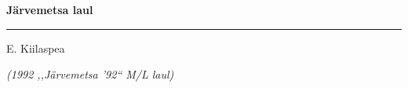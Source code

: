 \documentclass[10pt]{book}
\begin{document}
\pagebreak[3]
\clearpage
{
  \samepage
  \raggedbottom
  \raggedright
  \sloppy


  \vspace{0.2in}
    \centerline{
      \bfseries
      \large J\"arvemetsa laul
    }
  \nopagebreak[4]
  \vspace{0.1in}
  \nopagebreak[4]
  \hrule height 0.05ex
  \nopagebreak[4]
  \vspace{-0.05in}

  {\footnotesize  \hfill E. Kiilaspea }\\
  \vspace{0.01in}

  {\em {\footnotesize (1992 ,,J\"arvemetsa '92{``} M/L laul) } }
  \vspace{0.01in}

  \nopagebreak[4]
  {%
\parindent 0pt
\noindent
\ifx\preLilyPondExample \undefined
\else
  \expandafter\preLilyPondExample
\fi
\def\lilypondbook{}%

\ifx\postLilyPondExample \undefined
\else
  \expandafter\postLilyPondExample
\fi
}
  \vspace{-0.1in}

}
\end{document}
